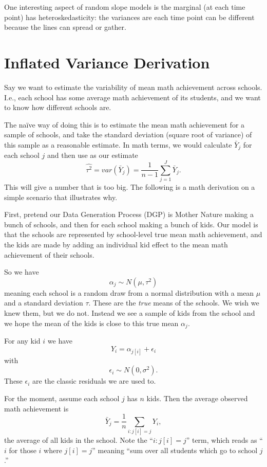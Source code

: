 \documentclass[
  letterpaper,
  DIV=11,
  numbers=noendperiod]{scrreprt}
\begin{document}
One interesting aspect of random slope models is the marginal (at each
time point) has heteroskedasticity: the variances are each time point
can be different because the lines can spread or gather.

\hypertarget{inflated-variance-derivation}{%
\chapter{Inflated Variance
Derivation}\label{inflated-variance-derivation}}

Say we want to estimate the variability of mean math achievement across
schools. I.e., each school has some average math achievement of its
students, and we want to know how different schools are.

The naïve way of doing this is to estimate the mean math achievement for
a sample of schools, and take the standard deviation (square root of
variance) of this sample as a reasonable estimate. In math terms, we
would calculate \(\bar{Y}_j\) for each school \(j\) and then use as our
estimate
\[\widehat{\tau^2} = var( \bar{Y}_j ) = \frac{1}{n-1} \sum_{j=1}^J \bar{Y}_j .\]
This will give a number that is too big. The following is a math
derivation on a simple scenario that illustrates why.

First, pretend our Data Generation Process (DGP) is Mother Nature making
a bunch of schools, and then for each school making a bunch of kids. Our
model is that the schools are represented by school-level true mean math
achievement, and the kids are made by adding an individual kid effect to
the mean math achievement of their schools.

So we have \[\alpha_j \sim N( \mu, \tau^2 )\] meaning each school is a
random draw from a normal distribution with a mean \(\mu\) and a
standard deviation \(\tau\). These are the \emph{true} means of the
schools. We wish we knew them, but we do not. Instead we see a sample of
kids from the school and we hope the mean of the kids is close to this
true mean \(\alpha_j\).

For any kid \(i\) we have \[Y_i  = \alpha_{j[i]} + \epsilon_i\] with
\[\epsilon_i \sim N( 0, \sigma^2 ).\] These \(\epsilon_i\) are the
classic residuals we are used to.

For the moment, assume each school \(j\) has \(n\) kids. Then the
average observed math achievement is
\[\bar{Y}_j = \frac{1}{n} \sum_{i : j[i] = j} Y_i ,\] the average of all
kids in the school. Note the ``\(i : j[i] = j\)'' term, which reads as
``\(i\) for those \(i\) where \(j[i] = j\)'' meaning ``sum over all
students which go to school \(j\).''
\end{document}
